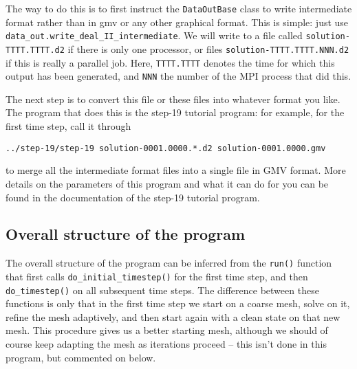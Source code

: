 \documentclass{article}
\begin{document}
The way to do this is to first instruct the \texttt{DataOutBase} class to
write intermediate format rather than in gmv or any other graphical
format. This is simple: just use
\texttt{data\_out.write\_deal\_II\_intermediate}. We will write to a file
called \texttt{solution-TTTT.TTTT.d2} if there is only one processor, or
files \texttt{solution-TTTT.TTTT.NNN.d2} if this is really a parallel
job. Here, \texttt{TTTT.TTTT} denotes the time for which this output has
been generated, and \texttt{NNN} the number of the MPI process that did this.

The next step is to convert this file or these files into whatever
format you like. The program that does this is the step-19 tutorial program:
for example, for the first time step, call it through
\begin{center}
  \texttt{../step-19/step-19 solution-0001.0000.*.d2 solution-0001.0000.gmv}
\end{center}
to merge all the intermediate format files into a single file in GMV
format. More details on the parameters of this program and what it can do for
you can be found in the documentation of the step-19 tutorial program.



\subsection*{Overall structure of the program}

The overall structure of the program can be inferred from the \texttt{run()}
function that first calls \texttt{do\_initial\_timestep()} for the first time
step, and then \texttt{do\_timestep()} on all subsequent time steps. The
difference between these functions is only that in the first time step we
start on a coarse mesh, solve on it, refine the mesh adaptively, and then
start again with a clean state on that new mesh. This procedure gives us a
better starting mesh, although we should of course keep adapting the mesh as
iterations proceed -- this isn't done in this program, but commented on below.
\end{document}
